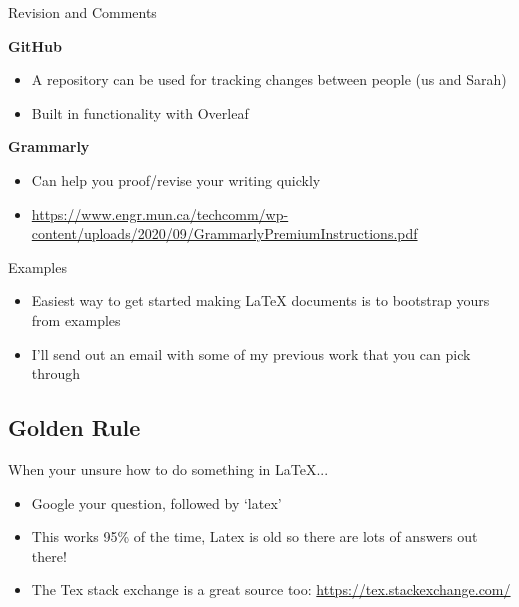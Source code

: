 \documentclass{beamer}
\begin{document}
\begin{frame}{Revision and Comments}

    \textbf{GitHub}
    \begin{itemize}
        \item A repository can be used for tracking changes between people (us and Sarah) 
        \item Built in functionality with Overleaf
    \end{itemize}
    
    \vspace{\baselineskip}
    
    \textbf{Grammarly}
    \begin{itemize}
        \item Can help you proof/revise your writing quickly
        \item \url{https://www.engr.mun.ca/techcomm/wp-content/uploads/2020/09/GrammarlyPremiumInstructions.pdf}
    \end{itemize}
    
\end{frame}

\begin{frame}{Examples}

    \begin{itemize}
        \item Easiest way to get started making \LaTeX{} documents is to bootstrap yours from examples
        \item I'll send out an email with some of my previous work that you can pick through
    \end{itemize}
    
\end{frame}

\subsection{Golden Rule}

\begin{frame}{When your unsure how to do something in \LaTeX... }
    
    \begin{itemize}
        \item Google your question, followed by `latex'
        \item This works 95\% of the time, Latex is old so there are lots of answers out there!
        \item The Tex stack exchange is a great source too: \url{https://tex.stackexchange.com/}
    \end{itemize}
    
\end{frame}
\end{document}
